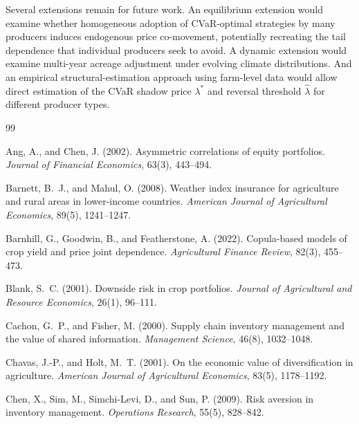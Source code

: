 \documentclass[12pt,review,authoryear]{elsarticle}
\numberwithin{equation}{section}
\begin{document}
Several extensions remain for future work.  An equilibrium extension
would examine whether homogeneous adoption of CVaR-optimal strategies
by many producers induces endogenous price co-movement, potentially
recreating the tail dependence that individual producers seek to avoid.
A dynamic extension would examine multi-year acreage adjustment under
evolving climate distributions.  And an empirical structural-estimation
approach using farm-level data would allow direct estimation of the
CVaR shadow price $\lambda^*$ and reversal threshold $\hat\lambda$ for
different producer types.

\begin{thebibliography}{99}

Ang, A., and Chen, J. (2002).
\newblock Asymmetric correlations of equity portfolios.
\newblock \emph{Journal of Financial Economics}, 63(3), 443--494.

Barnett, B.~J., and Mahul, O. (2008).
\newblock Weather index insurance for agriculture and rural areas in lower-income countries.
\newblock \emph{American Journal of Agricultural Economics}, 89(5), 1241--1247.

Barnhill, G., Goodwin, B., and Featherstone, A. (2022).
\newblock Copula-based models of crop yield and price joint dependence.
\newblock \emph{Agricultural Finance Review}, 82(3), 455--473.

Blank, S.~C. (2001).
\newblock Downside risk in crop portfolios.
\newblock \emph{Journal of Agricultural and Resource Economics}, 26(1), 96--111.

Cachon, G.~P., and Fisher, M. (2000).
\newblock Supply chain inventory management and the value of shared information.
\newblock \emph{Management Science}, 46(8), 1032--1048.

Chavas, J.-P., and Holt, M.~T. (2001).
\newblock On the economic value of diversification in agriculture.
\newblock \emph{American Journal of Agricultural Economics}, 83(5), 1178--1192.

Chen, X., Sim, M., Simchi-Levi, D., and Sun, P. (2009).
\newblock Risk aversion in inventory management.
\newblock \emph{Operations Research}, 55(5), 828--842.


\end{thebibliography}
\end{document}
